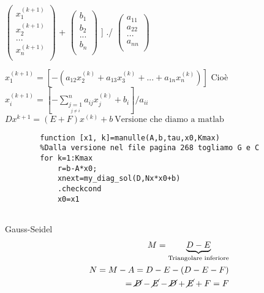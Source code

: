 \documentclass{article} %
\begin{document}
\begin{center}
        \(\begin{pmatrix}
            x_{1}^{(k+1)}\\
            x_{2}^{(k+1)} \\
            ...\\
            x_{n}^{(k+1)} \\
        \end{pmatrix}\)
        +
        \(\begin{pmatrix}
            b_{1}\\
            b_{2} \\
            ...\\
            b_{n} \\
        \end{pmatrix}\)
    ]
    ./
    \(\begin{pmatrix}
        a_{11}\\
        a_{22} \\
        ...\\
        a_{nn} \\
    \end{pmatrix}\)
    \newline

    \(
        x_1^{(k+1)}=[-(
        a_{12}x_2^{(k)} + a_{13}x_3^{(k)} + ... + a_{1n}x_n^{(k)})]
    \)
    Cioè 
    \newline
    \(
        x_i^{(k+1)}=[-
        \sum_{\underset{j\neq i}{j=1} }^{n}a_{ij}x_j^{(k)} + b_i]/a_{ii}
    \)
    \newline
    \(
        Dx^{k+1}=(E+F)x^(k)+b\ \text{Versione che diamo a matlab}
    \)
    

    \begin{lstlisting}
        function [x1, k]=manulle(A,b,tau,x0,Kmax)
        %Dalla versione nel file pagina 268 togliamo G e C
        for k=1:Kmax
            r=b-A*x0;
            xnext=my_diag_sol(D,Nx*x0+b)
            .checkcond
            x0=x1


    \end{lstlisting}
    Gauss-Seidel
\begin{align*}
    M=\underbrace{D-E}_{\text{Triangolare inferiore}}\\
    N=M-A=D-E-(D-E-F)\\
    =\cancel{D}-\cancel{E}-\cancel{D}+\cancel{E}+F=F\\
\end{align*}


\end{center}
\end{document}
